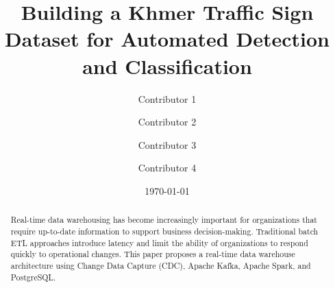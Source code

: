 \documentclass[12pt,a4paper,twocolumn]{article}
\title{Building a Khmer Traffic Sign Dataset for Automated Detection and Classification}
\author{
    Contributor 1 \and
    Contributor 2 \and
    Contributor 3 \and
    Contributor 4
}
\date{\today}
\begin{document}
\maketitle

\begin{abstract}
Real-time data warehousing has become increasingly important for organizations
that require up-to-date information to support business decision-making.
Traditional batch ETL approaches introduce latency and limit the ability of
organizations to respond quickly to operational changes. This paper proposes
a real-time data warehouse architecture using Change Data Capture (CDC),
Apache Kafka, Apache Spark, and PostgreSQL.
\end{abstract}

\tableofcontents
\newpage











\end{document}
